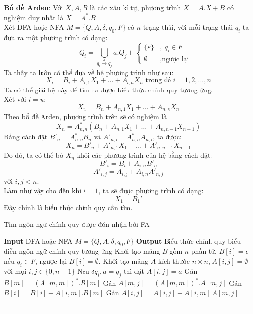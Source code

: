 \documentclass[12pt,a4paper]{article}
\begin{document}
\textbf{Bổ đề Arden}: Với $X, A, B$ là các xâu kí tự, phương trình $X = A.X + B$ có nghiệm duy nhất là $X = A^*.B$\\
Xét DFA hoặc NFA $M = \{Q, A, \delta, q_0, F\}$ có $n$ trạng thái, với mỗi trạng thái $q_i$ ta đưa ra một phương trình có dạng:
\[\qquad \displaystyle Q_i = \bigcup\limits_{q_i \overset{a}{\to} q_j} a.Q_j + \begin{cases} \{\varepsilon\} &,\ q_i \in F \\ \emptyset &, \text{ngược lại}\end{cases}\]
Ta thấy ta luôn có thể đưa về hệ phương trình như sau:
\[X_i = B_i + A_{i,1}X_1 + … + A_{i,n}X_n \text{ trong đó } i = 1, 2, ..., n\]
Ta có thể giải hệ này để tìm ra được biểu thức chính quy tương ứng.\\
Xét với $i=n$:
\[X_n = B_n + A_{n,1}X_1 + … + A_{n,n}X_n\]
Theo bổ đề Arden, phương trình trên sẽ có nghiệm là 
\[X_n = A_{n,n}^* (B_n + A_{n,1}X_1 + … + A_{n,n-1}X_{n-1})\]
Bằng cách đặt $B'_n = A_{n,n}^* B_n$ và $A'_{n,i}=A_{n,n}^*A_{n,i}$, ta được:
\[X_n = B'_n + A'_{n,1}X_1 + … + A'_{n,n-1}X_{n-1}\]
Do đó, ta có thể bỏ $X_n$ khỏi các phương trình của hệ bằng cách đặt:
\[B'_i = B_i + A_{i,n}B'_n\]
\[A'_{i,j} = A_{i,j} + A_{i,n}A'_{n,j}\]
với $i, j < n$.\\
Làm như vậy cho đến khi $i=1$, ta sẽ được phương trình có dạng:
\[X_1 = B_1'\]
Đây chính là biểu thức chính quy cần tìm.
\begin{algorithm}[H]
\caption{Tìm ngôn ngữ chính quy được đón nhận bởi FA}
\begin{algorithmic} 
\STATE \textbf{Input} DFA hoặc NFA $M = \{Q, A, \delta, q_0, F\}$
\STATE \textbf{Output} Biểu thức chính quy biểu diễn ngôn ngữ chính quy tương ứng
\STATE Khởi tạo mảng $B$ gồm $n$ phần tử, $B[i] = \epsilon$ nếu $q_i \in F$, ngược lại $B[i] = \emptyset$.
\STATE Khởi tạo mảng $A$ kích thước $n \times n$, $A[i, j] = \emptyset$ với mọi $i, j \in \{0, n-1\}$
\STATE Nếu $\delta{q_i, a} = q_j$ thì đặt $A[i, j] = a$
\STATE Gán $B[m] = (A[m, m])^*.B[m]$
\STATE Gán $A[m, j] = (A[m, m])^*.A[m, j]$
\ENDFOR
{}
\STATE Gán $B[i] = B[i] + A[i, m].B[m]$
\STATE Gán $A[i, j] = A[i, j] + A[i, m].A[m, j]$
\ENDFOR
\ENDFOR
\ENDFOR
\end{algorithmic}
\end{algorithm}
--------------------------------------------------------------------------------\\
\end{document}
